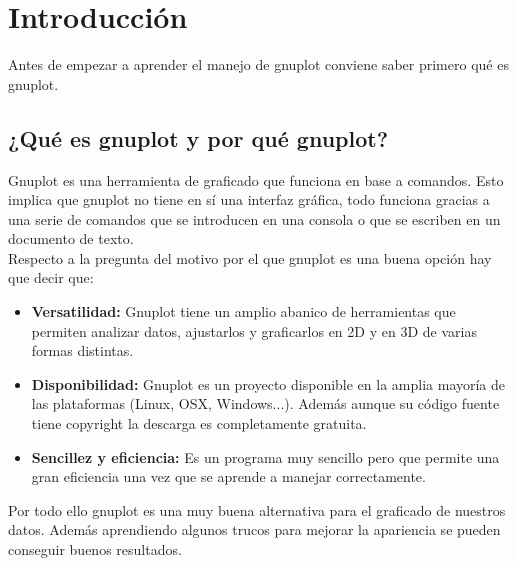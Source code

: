 \documentclass[11pt,a4paper,twoside,pdf]{article}
\numberwithin{equation}{section}
\begin{document}
\vfill \clearpage

\newpage

\tableofcontents

\newpage

\pagestyle{fancy}
\fancyhead[RO,LE]{\leftmark}
\fancyhead[LO,RE]{\thepage}
\fancyfoot{}

\section{Introducción}

Antes de empezar a aprender el manejo de gnuplot conviene saber primero qué es gnuplot.

\subsection{¿Qué es gnuplot y por qué gnuplot?}

Gnuplot es una herramienta de graficado que funciona en base a comandos. Esto implica que gnuplot no tiene en sí una interfaz gráfica, todo funciona gracias a una serie de comandos que se introducen en una consola o que se escriben en un documento de texto. \\

Respecto a la pregunta del motivo por el que gnuplot es una buena opción hay que decir que:

\begin{itemize}
    \item \textbf{Versatilidad:} Gnuplot tiene un amplio abanico de herramientas que permiten analizar datos, ajustarlos y graficarlos en 2D y en 3D de varias formas distintas.
    \item \textbf{Disponibilidad:} Gnuplot es un proyecto disponible en la amplia mayoría de las plataformas (Linux, OSX, Windows...). Además aunque su código fuente tiene copyright la descarga es completamente gratuita.\cite{gnuplot-5.4-doc}
    \item \textbf{Sencillez y eficiencia:} Es un programa muy sencillo pero que permite una gran eficiencia una vez que se aprende a manejar correctamente.
\end{itemize}

Por todo ello gnuplot es una muy buena alternativa para el graficado de nuestros datos. Además aprendiendo algunos trucos para mejorar la apariencia se pueden conseguir buenos resultados.
\end{document}
